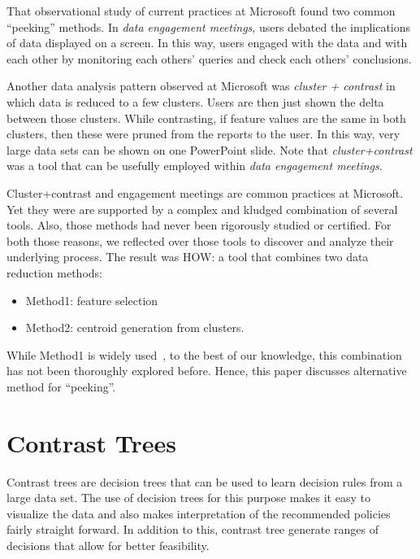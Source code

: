 \documentclass[conference]{IEEEtran}
\newcommand{\bi}{\begin{itemize}}
\newcommand{\ei}{\end{itemize}}
\begin{document}
That observational study of current practices
at Microsoft found two common ``peeking'' methods.
In {\em data engagement meetings},
users debated the implications of data
displayed on a screen. In this way, users
engaged with the data and with each other by
monitoring each others' queries and check each others'
conclusions.

Another data analysis pattern observed
at Microsoft was  {\em cluster + contrast} in which
data is  reduced to a few
  clusters. Users are then just shown the delta between those
  clusters. While contrasting, if feature values are
  the same in both clusters, then these were pruned from
  the reports to the user. In this way, very large
data sets can be shown on one PowerPoint
slide. Note that {\em cluster+contrast} was a tool that can be usefully employed within
{\em data engagement meetings}.


Cluster+contrast and engagement
meetings are common practices at Microsoft. Yet they were
are supported by a complex and kludged combination of several
tools. Also, those methods had never been rigorously studied or certified.
For both those reasons,
 we reflected over those tools to discover and analyze their
underlying process. The result was HOW: a tool
that combines two
data reduction methods:\bi
\item Method1: feature selection
\item Method2: centroid generation from   clusters.
\ei
While Method1 is widely used~\cite{Menzies2010},
to the best of our knowledge, this combination has not been thoroughly explored before.
Hence, this paper discusses alternative method for ``peeking''.
\section{Contrast Trees}
Contrast trees are decision trees that can be used to learn decision rules from a large data set. The use of decision trees for this purpose makes it easy to visualize the data and also makes interpretation of the recommended policies fairly straight forward. In addition to this, contrast tree generate ranges of decisions that allow for better feasibility.
\end{document}
